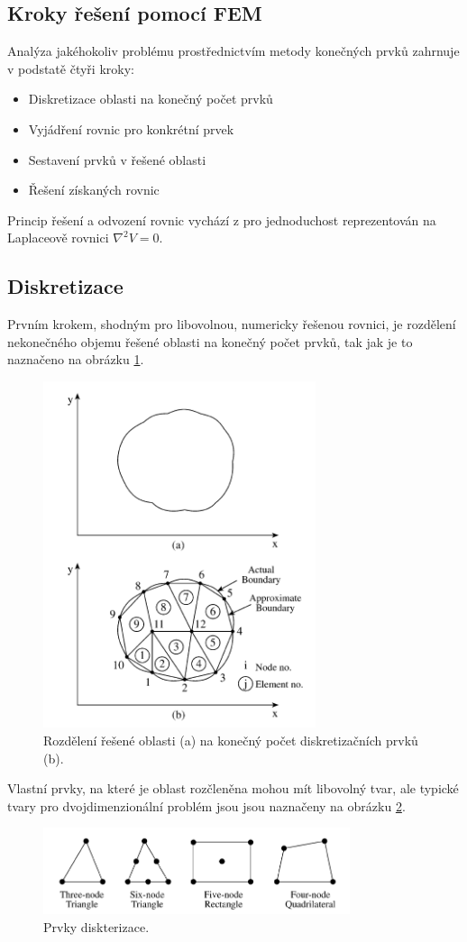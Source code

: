 \subsection{Kroky řešení pomocí FEM}
Analýza jakéhokoliv problému prostřednictvím metody konečných prvků zahrnuje v podstatě čtyři kroky:
\begin{itemize}
\item {Diskretizace oblasti na konečný počet prvků}
\item {Vyjádření rovnic pro konkrétní prvek}
\item {Sestavení prvků v řešené oblasti}
\item {Řešení získaných rovnic}
\end{itemize}
Princip řešení a odvození rovnic vychází z \cite[kap. 6.2]{num} pro jednoduchost reprezentován na Laplaceově rovnici $\nabla^{2}V = 0$.

\subsection*{Diskretizace}
Prvním krokem, shodným pro libovolnou, numericky řešenou rovnici, je rozdělení nekonečného objemu řešené oblasti na konečný počet prvků, tak jak je to naznačeno na obrázku \ref{obr:sim_diskretizace}.
\begin{figure}[!h]
	\centering
	\includegraphics[width=8cm]{sim_diskretizace.png}
	\caption{Rozdělení řešené oblasti (a) na konečný počet diskretizačních prvků (b).\cite{num}}
	\label{obr:sim_diskretizace}
\end{figure}
Vlastní prvky, na které je oblast rozčleněna mohou mít libovolný tvar, ale typické tvary pro dvojdimenzionální problém jsou jsou naznačeny na obrázku \ref{obr:sim_prvky}.
\begin{figure}[!h]
	\centering
	\includegraphics[width=9cm]{sim_prvky.png}
	\caption{Prvky diskterizace.\cite{num}}
	\label{obr:sim_prvky}
\end{figure}


